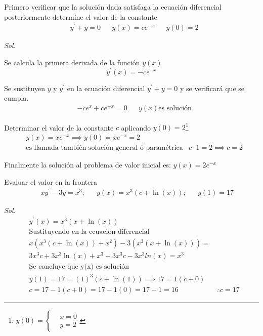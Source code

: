 \begin{example}
    Primero verificar que la solución dada satisfaga la ecuación diferencial posteriormente determine el valor de la constante
    \begin{align*}
        &y^{\prime}+y=0&& y(x)=ce^{-x}&&y(0)=2
    \end{align*}
\end{example}

\textit{ Sol. }

Se calcula la primera derivada de la función $y(x)$ 
\begin{equation*}
    y^{\prime}(x)=-ce^{-x}
\end{equation*}

Se sustituyen $y$ y $y^{\prime}$ en la ecuación diferencial
$y^{\prime}+y=0$ y se verificará que se cumpla.
\begin{align*}
    &-ce^{x}+ce^{-x}=0&&y(x)\text{es solución}
\end{align*}

Determinar el valor de la constante $c$ aplicando $y(0)=2$\footnote{$y(0)=\begin{cases}&x=0\\&y=2\end{cases}$}
\begin{align*}
    &y(x)=xe^{-x}\implies y(0)=xe^{-x}=2\\
    &\text{es llamada también solución general ó  paramétrica}
    &c\cdot 1=2\implies c=2
\end{align*}

Finalmente la solución al problema de valor inicial es: $y(x)=2e^{-x}$

\begin{example}
    Evaluar el valor en la frontera
    \begin{align*}
        &&xy^{\prime}-3y=x^3;&&y(x)=x^3\left(c+\ln{(x)}\right);&&y(1)=17
    \end{align*}
\end{example}

\textit{ Sol. }
\begin{align*}
    &y^{\prime}(x)=x^3\left(x+\ln{(x)}\right)\\ 
    &\text{Sustituyendo en la ecuación diferencial}\\ 
    &x\left(x^3\left(c+\ln{(x)}\right)+x^2\right)-3\left(x^3\left(x+\ln{(x)}\right)\right)=\\ 
    &3x^3c+3x^3\ln{(x)}+x^3-3x^3c-3x^3ln{(x)}=x^3\\
    &\text{Se concluye que y(x) es solución}\\ 
    &y(1)=17=(1)^3\left(c+\ln{(1)}\right)\implies 17=1\left(c+0\right)\\ 
    &c=17-1\left(c+0\right)=17-1\left(0\right)=17-1=16
    &\therefore c=17
\end{align*}

